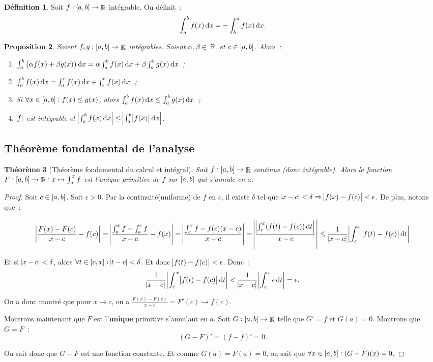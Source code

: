 \documentclass{article}
\DeclareMathOperator{\R}{\mathbb R}
\newcommand{\ab}{\interval ab}
\newcommand{\fabr}[1]{#1 : \ab \to \R}
\newtheorem{thm}{Théorème}[section]
\newtheorem{prp}[thm]{Proposition}
\theoremstyle{definition}
\newtheorem{déf}[thm]{Définition}
\theoremstyle{remark}
\begin{document}
		\begin{déf} Soit $\fabr f$ intégrable. On définit~:
		\[\int_a^bf(x)\dif x = -\int_b^af(x)\dif x.\]
		\end{déf}

		\begin{prp} Soient $\fabr {f, g}$ intégrables. Soient $\alpha, \beta \in \R$ et $c \in \ab$. Alors~:

		\begin{enumerate}
			\item $\int_a^b\left(\alpha f(x) + \beta g(x)\right)\dif x = \alpha \int_a^bf(x)\dif x + \beta\int_a^bg(x)\dif x$~;
			\item $\int_a^bf(x)\dif x = \int_a^cf(x)\dif x + \int_c^bf(x)\dif x$~;
			\item Si $\forall x \in \ab : f(x) \leq g(x)$, alors $\int_a^bf(x)\dif x \leq \int_a^bg(x)\dif x$~;
			\item $\abs f$ est intégrable et $\abs{\int_a^bf(x)\dif x} \leq \abs{\int_a^b\abs{f(x)}\dif x}$.
		\end{enumerate}
		\end{prp}
	
	\subsection{Théorème fondamental de l'analyse}

		\begin{thm}[Théorème fondamental du calcul et intégral] Soit $\fabr f$ continue (donc intégrable). Alors la fonction $\fabr F : x \mapsto \int_a^xf$
		est l'unique primitive de $f$ sur $\ab$ qui s'annule en $a$. \end{thm}

		\begin{proof} Soit $c \in \ab$. Soit $\epsilon > 0$. Par la continuité(uniforme) de $f$ en $c$, il existe $\delta$ tel que
		$\abs{x-c}<\delta \Rightarrow \abs{f(x)-f(c)} < \epsilon$. De plus, notons que~:

		\begin{align*}
			\abs{\frac {F(x)-F(c)}{x-c}-f(c)} = \abs{\frac {\int_a^xf - \int_a^cf}{x-c}-f(x)} = \abs{\frac {\int_c^xf - f(c)(x-c)}{x-c}}
			= \abs{\frac {\abs{\int_c^x(f(t)-f(c))\dif t}}{x-c}} \leq \frac 1{\abs{x-c}}\abs{\int_c^x\abs{f(t)-f(c)}\dif t}
		\end{align*}

		Et si $\abs{x-c} < \delta$, alors $\forall t \in \interval cx : \abs{t-c} < \delta $. Et donc $\abs{f(t)-f(c)} < \epsilon$. Donc~:
		\[\frac 1{\abs{x-c}}\abs{\int_c^x\abs{f(t)-f(c)}\dif t} < \frac 1{\abs{x-c}}\abs{\int_c^x\epsilon\dif t} = \epsilon.\]

		On a donc montré que pour $x \to c$, on a $\frac {F(x)-F(c)}{x-c} = F'(c) \to f(c)$.

		Montrons maintenant que $F$ est l'\textbf{unique} primitive s'annulant en $a$. Soit $\fabr G$ telle que $G' = f$ et $G(a) = 0$. Montrons que $G = F$~:
		\[(G-F)'=(f-f)' = 0.\]

		On sait donc que $G-F$ est une fonction constante. Et comme $G(a) = F(a) = 0$, on sait que $\forall x \in \ab : (G-F)(x) = 0$. \end{proof}
\end{document}
